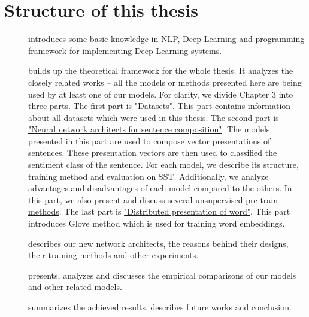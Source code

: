 \section{Structure of this thesis}
\begin{description}
\item [] introduces some basic knowledge in NLP, Deep Learning and programming framework for implementing Deep Learning systems. 
\item [] builds up the theoretical framework for the whole thesis. 
It analyzes the closely related works -- all the models or methods presented here are being used by at least one of our models.
For clarity, we divide Chapter 3 into three parts.
The first part is \hyperref[sec:dataset]{"Datasets"}. 
This part contains information about all datasets which were used in this thesis.
The second part is \hyperref[sec:composer]{"Neural network architects for sentence composition"}.
The models presented in this part are used to compose vector presentations of sentences.
These presentation vectors are then used to classified the sentiment class of the sentence.
For each model, we describe its structure, training method and evaluation on SST.
Additionally, we analyze advantages and disadvantages of each model compared to the others.
In this part, we also present and discuss several \hyperref[sec:unsupervised-pretrain]{unsupervised pre-train methods}.
The last part is \hyperref[sec:distributed-word]{"Distributed presentation of word"}. 
This part introduces Glove method which is used for training word embeddings.
\item [] describes our new network architects, the reasons behind their designs, their training methods and other experiments. 
\item [] presents, analyzes and discusses the empirical comparisons of our models and other related models.
\item [] summarizes the achieved results, describes future works and conclusion.
\end{description}